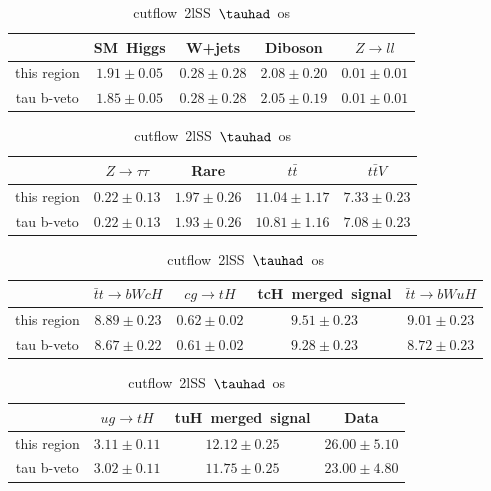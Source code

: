 \begin{table}
\footnotesize
\caption{cutflow~2lSS~$\tauhad$~os}
\centering
\begin{tabular}{|c|c|c|c|c|} \hline
 & SM~Higgs & W+jets & Diboson & $Z\to ll$\\\hline
this region & $1.91\pm0.05$ & $0.28\pm0.28$ & $2.08\pm0.20$ & $0.01\pm0.01$\\\hline
tau b-veto & $1.85\pm0.05$ & $0.28\pm0.28$ & $2.05\pm0.19$ & $0.01\pm0.01$\\\hline
\end{tabular}
\begin{tabular}{|c|c|c|c|c|} \hline
 & $Z\to \tau\tau$ & Rare & $t\bar{t}$ & $t\bar{t}V$\\\hline
this region & $0.22\pm0.13$ & $1.97\pm0.26$ & $11.04\pm1.17$ & $7.33\pm0.23$\\\hline
tau b-veto & $0.22\pm0.13$ & $1.93\pm0.26$ & $10.81\pm1.16$ & $7.08\pm0.23$\\\hline
\end{tabular}
\begin{tabular}{|c|c|c|c|c|} \hline
 & $\bar{t}t\to bWcH$ & $cg\to tH$ & tcH~merged~signal & $\bar{t}t\to bWuH$\\\hline
this region & $8.89\pm0.23$ & $0.62\pm0.02$ & $9.51\pm0.23$ & $9.01\pm0.23$\\\hline
tau b-veto & $8.67\pm0.22$ & $0.61\pm0.02$ & $9.28\pm0.23$ & $8.72\pm0.23$\\\hline
\end{tabular}
\begin{tabular}{|c|c|c|c|} \hline
 & $ug\to tH$ & tuH~merged~signal & Data\\\hline
this region & $3.11\pm0.11$ & $12.12\pm0.25$ & $26.00\pm5.10$\\\hline
tau b-veto & $3.02\pm0.11$ & $11.75\pm0.25$ & $23.00\pm4.80$\\\hline
\end{tabular}
\label{tab:cutflow_reg2lSS1tau1bnj_os}
\end{table}
